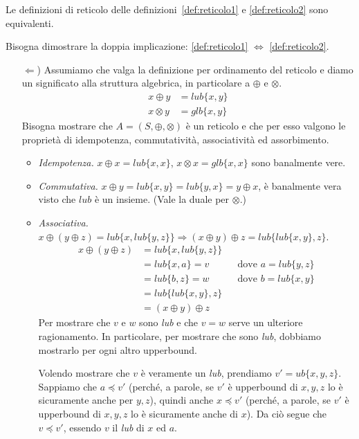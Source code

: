 \begin{proposizione} 
\textup{\cite{BurrisS81}} Le definizioni di reticolo
delle definizioni~\textup{\ref{def:reticolo1}} e \textup{\ref{def:reticolo2}}
sono equivalenti.

Bisogna dimostrare la doppia implicazione: \textup{\ref{def:reticolo1}} $\Leftrightarrow$ \textup{\ref{def:reticolo2}}.
\begin{itemize}
\item[$\Leftarrow$)] Assumiamo che valga la definizione per ordinamento del reticolo e diamo un significato alla struttura algebrica, in particolare a $\oplus$ e $\otimes$.
\begin{align*}
    x \oplus y &= lub\{x,y\} \\
    x \otimes y &= glb\{x,y\}
\end{align*}
Bisogna mostrare che $A = (S, \oplus, \otimes)$ è un reticolo e che per esso valgono le proprietà di idempotenza, commutatività, associatività ed assorbimento.
\begin{itemize}
\item \emph{Idempotenza.} $x \oplus x = lub\{x,x\}$, $x \otimes x = glb\{x,x\}$ sono banalmente vere.
\item \emph{Commutativa.} $x \oplus y = lub\{x,y\} = lub\{y,x\} = y \oplus x$,
è banalmente vera visto che $lub$ è un insieme. (Vale la duale per $\otimes$.)
\item \emph{Associativa.} $x \oplus (y \oplus z) = lub\{x,lub\{y,z\}\} \Rightarrow (x \oplus y) \oplus z = lub\{lub\{x,y\}, z\}$.
\begin{align*}
    x \oplus (y \oplus z) &= lub\{x,lub\{y,z\}\} \\
        &= lub\{x,a\} = v && \text{dove } a = lub\{y,z\} \\
        &= lub\{b,z\} = w && \text{dove } b = lub\{x,y\} \\
        &= lub\{lub\{x,y\}, z\} \\
        &= (x \oplus y) \oplus z
\end{align*}
Per mostrare che $v$ e $w$ sono \emph{lub} e che $v=w$ serve un ulteriore 
ragionamento. In particolare, per mostrare che sono \emph{lub}, dobbiamo 
mostrarlo per ogni altro upperbound.

Volendo mostrare che $v$ è veramente un \emph{lub}, prendiamo 
$v'=ub\{x,y,z\}$. Sappiamo che $a \preceq v'$ (perché, a parole, se $v'$ è 
upperbound di $x, y, z$ lo è sicuramente anche per $y, z$), quindi anche 
$x \preceq v'$ (perché, a parole, se $v'$ è upperbound di $x, y, z$ lo è 
sicuramente anche di $x$). Da ciò segue che $v \preceq v'$, essendo $v$ il 
\emph{lub} di $x$ ed $a$.


\end{itemize}
\end{itemize}
\end{proposizione}
